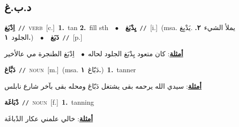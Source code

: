 \documentclass[10pt,a4paper,twoside]{article} %
\begin{document}
\begin{multicols}{2}
{{{\vspace{-3mm}
\subsection*{\color{blue}\foreignlanguage{arabic}{د.ب.غ}\color{blue}{}} 

{\setlength\topsep{0pt}\textbf{\foreignlanguage{arabic}{اِدْبَغ}}\ {\color{gray}\texttt{//}\color{black}}\ \textsc{verb}\ [c.]\ \textbf{1.}~tan  \textbf{2.}~fill sth\ \ $\bullet$\ \ \setlength\topsep{0pt}\textbf{\foreignlanguage{arabic}{يِدْبَغ}}\ {\color{gray}\texttt{//}\color{black}}\ [i.]\ \color{gray}(msa. \foreignlanguage{arabic}{يملأ الشيء}~\foreignlanguage{arabic}{\textbf{٢.}}  .\foreignlanguage{arabic}{يَدْبِغ الجلود}~\foreignlanguage{arabic}{\textbf{١.}})\color{black}\ \ $\bullet$\ \ \setlength\topsep{0pt}\textbf{\foreignlanguage{arabic}{دَبَغ}}\ {\color{gray}\texttt{//}\color{black}}\ [p.]\  \begin{flushright}\color{gray}\foreignlanguage{arabic}{\textbf{\underline{\foreignlanguage{arabic}{أمثلة}}}: كان متعود يِدْبَغ الجلود لحاله\ $\bullet$\ \  اِدْبَغ الطنجرة مي عالأخير}\end{flushright}\color{black}} \vspace{2mm}

{\setlength\topsep{0pt}\textbf{\foreignlanguage{arabic}{دَبَّاغ}}\ {\color{gray}\texttt{//}\color{black}}\ \textsc{noun}\ [m.]\ \color{gray}(msa. \foreignlanguage{arabic}{دَبّاغ}~\foreignlanguage{arabic}{\textbf{١.}})\color{black}\ \textbf{1.}~tanner\  \begin{flushright}\color{gray}\foreignlanguage{arabic}{\textbf{\underline{\foreignlanguage{arabic}{أمثلة}}}: سيدي الله يرحمه بقى يشتغل دَبّاغ ومحله بقى بآخر شارع نابلس}\end{flushright}\color{black}} \vspace{2mm}

{\setlength\topsep{0pt}\textbf{\foreignlanguage{arabic}{دْبَاغَة}}\ {\color{gray}\texttt{//}\color{black}}\ \textsc{noun}\ [f.]\ \textbf{1.}~tanning\  \begin{flushright}\color{gray}\foreignlanguage{arabic}{\textbf{\underline{\foreignlanguage{arabic}{أمثلة}}}: خالي علمني عكار الدْباغَة}\end{flushright}\color{black}} \vspace{2mm}

}}}
\end{multicols}
\end{document}
